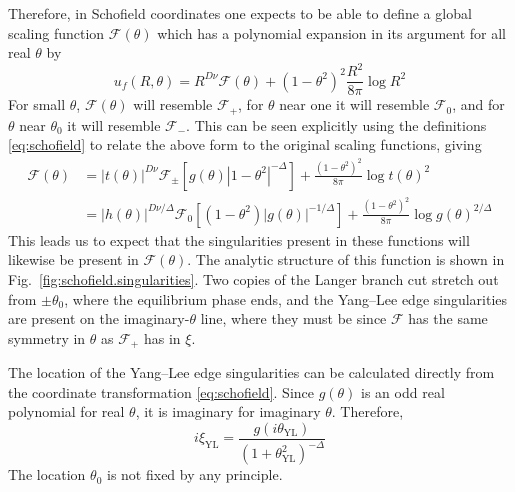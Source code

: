 \documentclass[
aps,
pre,
preprint,
longbibliography,
floatfix
]{revtex4-2}
\begin{document}
Therefore, in Schofield coordinates one expects to be able to define a global
scaling function $\mathcal F(\theta)$ which has a polynomial expansion in its
argument for all real $\theta$ by
\begin{equation}
  u_f(R,\theta)=R^{D\nu}\mathcal F(\theta)+(1-\theta^2)^2\frac{R^2}{8\pi}\log R^2
\end{equation}
For small $\theta$, $\mathcal F(\theta)$ will
resemble $\mathcal F_+$, for $\theta$ near one it will resemble $\mathcal F_0$,
and for $\theta$ near $\theta_0$ it will resemble $\mathcal F_-$. This can be seen explicitly using the definitions \eqref{eq:schofield} to relate the above form to the original scaling functions, giving
\begin{equation} \label{eq:scaling.function.equivalences.2d}
  \begin{aligned}
    \mathcal F(\theta)
    &=|t(\theta)|^{D\nu}\mathcal F_\pm\left[g(\theta)|1-\theta^2|^{-\Delta}\right]
    +\frac{(1-\theta^2)^2}{8\pi}\log t(\theta)^2\\
    &=|h(\theta)|^{D\nu/\Delta}\mathcal F_0\left[(1-\theta^2)|g(\theta)|^{-1/\Delta}\right]
    +\frac{(1-\theta^2)^2}{8\pi}\log g(\theta)^{2/\Delta}
  \end{aligned}
\end{equation}
This leads us
to expect that the singularities present in these functions will likewise be
present in $\mathcal F(\theta)$. The analytic structure of this function is
shown in Fig.~\ref{fig:schofield.singularities}. Two copies of the Langer
branch cut stretch out from $\pm\theta_0$, where the equilibrium phase ends,
and the Yang--Lee edge singularities are present on the imaginary-$\theta$
line, where they must be since $\mathcal F$ has the same symmetry in $\theta$
as $\mathcal F_+$ has in $\xi$.

The location of the Yang--Lee edge singularities can be calculated directly
from the coordinate transformation \eqref{eq:schofield}. Since $g(\theta)$ is
an odd real polynomial for real $\theta$, it is imaginary for imaginary
$\theta$. Therefore,
\begin{equation} \label{eq:yang-lee.theta}
  i\xi_{\mathrm{YL}}=\frac{g(i\theta_{\mathrm{YL}})}{(1+\theta_{\mathrm{YL}}^2)^{-\Delta}}
\end{equation}
The location $\theta_0$ is not fixed by any principle.
\end{document}
